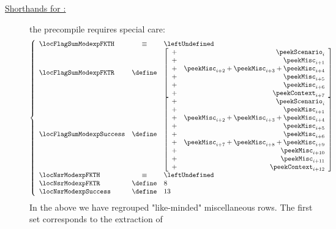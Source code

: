 \begin{description}
	\item[\underline{\underline{Shorthands for \instModexp{}:}}] the \instModexp{} precompile requires special care:
		\[
			\left\{ \begin{array}{lcl}
				\locFlagSumModexpFKTH & \equiv  & \leftUndefined \\
				\locFlagSumModexpFKTR & \define &
				\left[ \begin{array}{cr}
					+ & \peekScenario _{i     } \\
					+ & \peekMisc     _{i +  1} \\
					+ & \peekMisc     _{i +  2} 
					+   \peekMisc     _{i +  3} 
					+   \peekMisc     _{i +  4} \\
					+ & \peekMisc     _{i +  5} \\
					+ & \peekMisc     _{i +  6} \\
					+ & \peekContext  _{i +  7} \\
				\end{array} \right] \\
				\locFlagSumModexpSuccess & \define &
				\left[ \begin{array}{cr}
					+ & \peekScenario _{i     } \\
					+ & \peekMisc     _{i +  1} \\
					+ & \peekMisc     _{i +  2} 
					+   \peekMisc     _{i +  3} 
					+   \peekMisc     _{i +  4} \\
					+ & \peekMisc     _{i +  5} \\
					+ & \peekMisc     _{i +  6} \\
					+ & \peekMisc     _{i +  7} 
					+   \peekMisc     _{i +  8} 
					+   \peekMisc     _{i +  9} \\
					+ & \peekMisc     _{i + 10} \\
					+ & \peekMisc     _{i + 11} \\
					+ & \peekContext  _{i + 12} \\
				\end{array} \right] \\
				\locNsrModexpFKTH    & \equiv  & \leftUndefined \\
				\locNsrModexpFKTR    & \define & 8              \\
				\locNsrModexpSuccess & \define & 13             \\
			\end{array} \right.
		\]
		In the above we have regrouped "like-minded" miscellaneous rows.
		The first set corresponds to the extraction of

\end{description}
